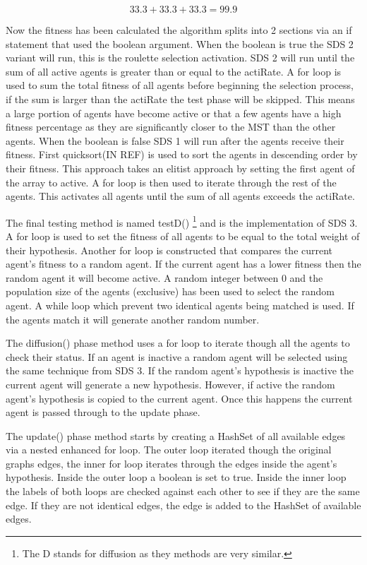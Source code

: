 \documentclass{AISB2008}
\begin{document}
{\begin{equation}
33.3 + 33.3 + 33.3 = 99.9
\end{equation}

Now the fitness has been calculated the algorithm splits into 2 sections via an if statement that used the boolean argument. When the boolean is true the SDS 2 variant will run, this is the roulette selection activation. SDS 2 will run until the sum of all active agents is greater than or equal to the actiRate. A for loop is used to sum the total fitness of all agents before beginning the selection process, if the sum is larger than the actiRate the test phase will be skipped. This means a large portion of agents have become active or that a few agents have a high fitness percentage as they are significantly closer to the MST than the other agents.
When the boolean is false SDS 1 will run after the agents receive their fitness. First quicksort(IN REF) is used to sort the agents in descending order by their fitness. This approach takes an elitist approach by setting the first agent of the array to active. A for loop is then used to iterate through the rest of the agents. This activates all agents until the sum of all agents exceeds the actiRate.

The final testing method is named testD() \footnote{The D stands for diffusion as they methods are very similar.} and is the implementation of SDS 3. A for loop is used to set the fitness of all agents to be equal to the total weight of their hypothesis. Another for loop is constructed that compares the current agent’s fitness to a random agent. If the current agent has a lower fitness then the random agent it will become active. A random integer between 0 and the population size of the agents (exclusive) has been used to select the random agent. A while loop which prevent two identical agents being matched is used. If the agents match it will generate another random number.

The diffusion() phase method uses a for loop to iterate though all the agents to check their status. If an agent is inactive a random agent will be selected using the same technique from SDS 3. If the random agent’s hypothesis is inactive the current agent will generate a new hypothesis. However, if active the random agent’s hypothesis is copied to the current agent. Once this happens the current agent is passed through to the update phase.

The update() phase method starts by creating a HashSet of all available edges via a nested enhanced for loop. The outer loop iterated though the original graphs edges, the inner for loop iterates through the edges inside the agent’s hypothesis. Inside the outer loop a boolean is set to true. Inside the inner loop the labels of both loops are checked against each other to see if they are the same edge. If they are not identical edges, the edge is added to the HashSet of available edges.

}
\end{document}
